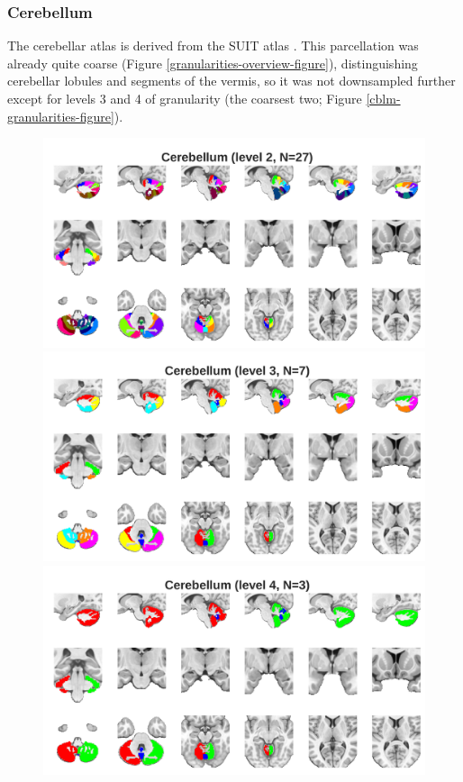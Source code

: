 \documentclass[10pt,letterpaper]{article}
\begin{document}
\subsubsection{Cerebellum} The cerebellar atlas is derived from the SUIT atlas . This parcellation was already quite coarse (Figure \ref{granularities-overview-figure}), distinguishing cerebellar lobules and segments of the vermis, so it was not downsampled further except for levels 3 and 4 of granularity (the coarsest two; Figure \ref{cblm-granularities-figure}).

\begin{figure}[t]
\centering
\begin{minipage}{\linewidth}
\includegraphics[width=\linewidth]{images/cblm_coarse.png}
\end{minipage}
\begin{minipage}{\linewidth}
\includegraphics[width=\linewidth]{images/cblm_coarser.png}
\end{minipage}
\begin{minipage}{\linewidth}
\includegraphics[width=\linewidth]{images/cblm_coarsest.png}

\end{minipage}
\end{figure}
\end{document}
